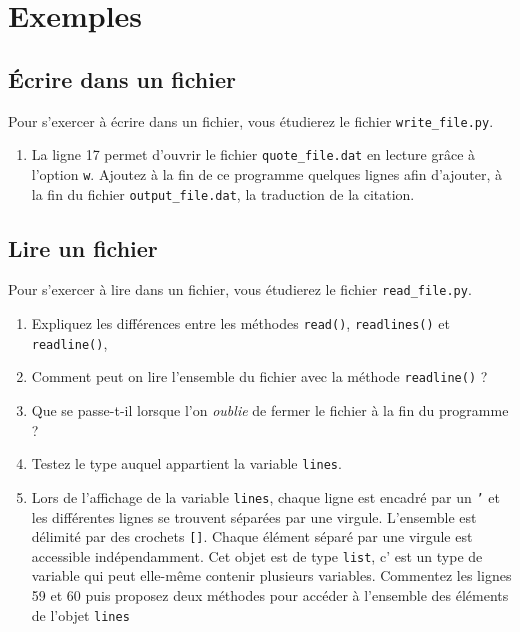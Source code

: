 \section{Exemples}

\subsection{Écrire dans un fichier}

Pour s'exercer à écrire dans un fichier, vous étudierez le fichier \texttt{write\_file.py}.

\begin{enumerate}

\item La ligne 17 permet d'ouvrir le fichier \texttt{quote\_file.dat} en lecture grâce
  à l'option \texttt{w}.
  Ajoutez à la fin de ce programme quelques lignes afin d'ajouter, à la fin du
  fichier \texttt{output\_file.dat}, la traduction de la citation.

\end{enumerate}

\subsection{Lire un fichier}

Pour s'exercer à lire dans un fichier, vous étudierez le fichier \texttt{read\_file.py}.

\begin{enumerate}

\item Expliquez les différences entre les méthodes \texttt{read()},
  \texttt{readlines()} et \texttt{readline()},

\item Comment peut on lire l'ensemble du fichier avec la méthode \texttt{readline()} ?

\item Que se passe-t-il lorsque l'on \textit{oublie} de fermer le fichier à la fin du programme ?

\item Testez le type auquel appartient la variable \texttt{lines}.

\item Lors de l'affichage de la variable \texttt{lines}, chaque ligne est encadré par un \texttt{'} et
  les différentes lignes se trouvent séparées par une virgule. L'ensemble est délimité par des crochets \texttt{[]}.
  Chaque élément séparé par une virgule est accessible indépendamment.
  Cet objet est de type \texttt{list}, c' est un type de variable qui peut elle-même contenir plusieurs variables.
  Commentez les lignes 59 et 60 puis proposez deux méthodes pour accéder à l'ensemble des éléments de l'objet \texttt{lines}

\end{enumerate}

